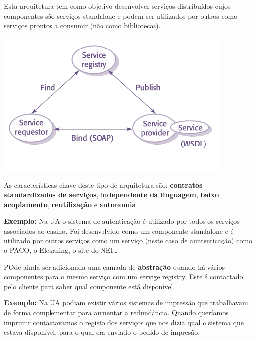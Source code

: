 \documentclass{article}
\begin{document}
\pagebreak

Esta arquitetura tem como objetivo desenvolver serviços distribuídos cujos
componentes são serviços standalone e podem ser utilizados por outros
como serviços prontos a consumir (não como bibliotecas).

\begin{center}
  \includegraphics[scale=0.55]{64}
\end{center}

As características chave deste tipo de arquitetura são: \textbf{contratos standardizados de serviços},
\textbf{independente da linguagem}, \textbf{baixo acoplamento}, \textbf{reutilização}
e \textbf{autonomia}.

\vspace{2mm}

\begin{flushleft}
  \textbf{Exemplo:} Na UA o sistema de autenticação é utilizado por todos os serviços associados ao ensino. Foi desenvolvido
  como um componente standalone e é utilizado por outros serviços como um serviço (neste caso de auntenticação)
  como o PACO, o Elearning, o site do NEI\dots
\end{flushleft}

POde ainda ser adicionada uma camada de \textbf{abstração} quando
há vários componentes para o mesmo serviço com um servige registry.
Este é contactado pelo cliente para saber qual componente está disponível.

\begin{flushleft}
  \textbf{Exemplo:} Na  UA podiam existir vários sistemas de impressão que trabalhavam de forma complementar para
  aumentar a redundância. Quando queríamos imprimir contactavamos o registo dos serviços que nos dizia qual o
  sistema que estava disponível, para o qual era enviado o pedido de impresão.  
\end{flushleft}
\end{document}
